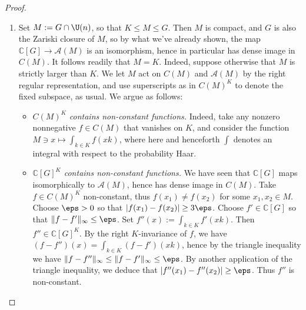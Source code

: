\documentclass[reqno]{amsart} 
\begin{document}
\begin{proof}
\begin{enumerate}
    To complete the proof, we just need to check that any $K \times K$-invariant dense subspace of $\mathcal{A}(K)$ is actually equal to $\mathcal{A}(K)$.  Maybe there's a simpler way to see this, but let's see.  We claim that for any finite subset $\Pi$ of $\Irr(K)$ and any $K \times K$-invariant subspace $V$ of $\oplus_{\pi \in \Pi} \mathcal{A}(\pi)$, one has $V = \oplus_{\pi \in \Pi_0} \mathcal{A}(\pi)$ for some subset $\Pi_0$ of $\Pi$.  (To see that the claim suffices, note that for each $\pi \in \Irr(K)$, we may find $f \in \mathbb{C}[G]$ so that the component $f_\pi \in \mathcal{A}(\pi)$ of $f$ is nonzero, because otherwise $\mathbb{C}[G]$ would be contained in the proper closed subspace of $\mathcal{A}(K)$ given by the orthogonal complement of $\mathcal{A}(\pi)$; then take for $\Pi$ the set of all $\pi '$ for which $f_{\pi '} \neq 0$ and for $V$ the span of the $K \times K$-orbit of $f$.  It follows from the claim that then $\mathbb{C}[G]$ contains $\mathcal{A}(\pi)$.  Since $\pi$ was arbitrary, we conclude that $\mathbb{C}[G] = \mathcal{A}(K)$.)  The claim follows immediately from character theory for $K \times K$, which gives that $\chi_V = \sum_{\pi \in \Pi} n(\pi) \overline{\chi_\pi } \otimes \chi_\pi$ for some $n(\pi) \in \{0,1\}$; here $(\overline{\chi_\pi } \otimes \chi_\pi)(g_1,g_2) := \overline{\chi _\pi }(g_1) \chi_\pi(g_2)$.
  \item Set $M := G \cap \U(n)$, so that $K \leq M \leq G$.  Then $M$ is compact, and $G$ is also the Zariski closure of $M$, so by what we've already shown, the map $\mathbb{C}[G] \rightarrow \mathcal{A}(M)$ is an isomorphism, hence in particular has dense image in $C(M)$.  It follows readily that $M = K$.  Indeed, suppose otherwise that $M$ is strictly larger than $K$.  We let $M$ act on $C(M)$ and $\mathcal{A}(M)$ by the right regular representation, and use superscripts as in $C(M)^K$ to denote the fixed subspace, as usual.  We argue as follows:
    \begin{itemize}
    \item \emph{$C(M)^K$ contains non-constant functions.}  Indeed, take any nonzero nonnegative $f \in C(M)$ that vanishes on $K$, and consider the function $M \ni x \mapsto \int_{k \in K} f(x k)$, where here and henceforth $\int$ denotes an integral with respect to the probability Haar.
    \item \emph{$\mathbb{C}[G]^K$ contains non-constant functions.}  We have seen that $\mathbb{C}[G]$ maps isomorphically to $\mathcal{A}(M)$, hence has dense image in $C(M)$.  Take $f \in C(M)^K$ non-constant, thus $f(x_1) \neq f(x_2)$ for some $x_1, x_2 \in M$.  Choose $\eps > 0$ so that $|f(x_1) - f(x_2)| \geq 3 \eps$.  Choose $f' \in \mathbb{C}[G]$ so that $\|f - f'\|_{\infty} \leq \eps$.  Set $f''(x) := \int_{k \in K} f'(x k)$.  Then $f'' \in \mathbb{C}[G]^K$.  By the right $K$-invariance of $f$, we have $(f - f'')(x) = \int_{k \in K} (f - f')(x k)$, hence by the triangle inequality we have $\|f - f''\|_{\infty} \leq \|f - f' \|_{\infty} \leq \eps$.  By another application of the triangle inequality, we deduce that $|f''(x_1) - f''(x_2)| \geq \eps$.  Thus $f''$ is non-constant.

\end{itemize}
\end{enumerate}
\end{proof}
\end{document}
